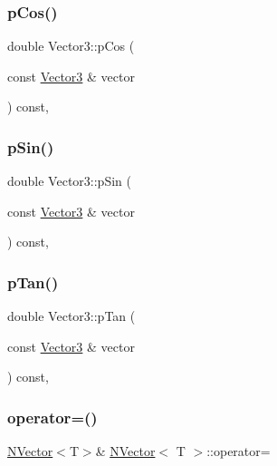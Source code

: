 \subsubsection{\texorpdfstring{pCos()}{pCos()}}
{\footnotesize\ttfamily double Vector3\+::p\+Cos (\begin{DoxyParamCaption}\item[{const \mbox{\hyperlink{class_vector3}{Vector3}} \&}]{vector }\end{DoxyParamCaption}) const\hspace{0.3cm}{\ttfamily [inline]}, {\ttfamily [protected]}}

\mbox{\label{class_vector3_a38053a75ccb2f7415fff046609c52e31}} 
\subsubsection{\texorpdfstring{pSin()}{pSin()}}
{\footnotesize\ttfamily double Vector3\+::p\+Sin (\begin{DoxyParamCaption}\item[{const \mbox{\hyperlink{class_vector3}{Vector3}} \&}]{vector }\end{DoxyParamCaption}) const\hspace{0.3cm}{\ttfamily [inline]}, {\ttfamily [protected]}}

\mbox{\label{class_vector3_aef71e3e404dd8183e3bd5ed901e91444}} 
\subsubsection{\texorpdfstring{pTan()}{pTan()}}
{\footnotesize\ttfamily double Vector3\+::p\+Tan (\begin{DoxyParamCaption}\item[{const \mbox{\hyperlink{class_vector3}{Vector3}} \&}]{vector }\end{DoxyParamCaption}) const\hspace{0.3cm}{\ttfamily [inline]}, {\ttfamily [protected]}}

\mbox{\label{class_vector3_ab793bf6d3d3fc05f91f435c1c0a8e5ea}} 
\subsubsection{\texorpdfstring{operator=()}{operator=()}}
{\footnotesize\ttfamily \mbox{\hyperlink{class_n_vector}{N\+Vector}}$<$T$>$\& \mbox{\hyperlink{class_n_vector}{N\+Vector}}$<$ T $>$\+::operator=\hspace{0.3cm}{\ttfamily [inline]}}



